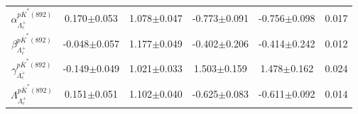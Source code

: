 \begin{table}[h]
{\begin{tabular}{cccccc}
            $\alpha_{\Lambda_c^+}^{p\overline{K}^*(892)}$ & 0.170$\pm$0.053 & 1.078$\pm$0.047 & -0.773$\pm$0.091 & -0.756$\pm$0.098 & 0.017\\
            $\beta_{\Lambda_c^+}^{p\overline{K}^*(892)}$ & -0.048$\pm$0.057 & 1.177$\pm$0.049 & -0.402$\pm$0.206 & -0.414$\pm$0.242 & 0.012\\
            $\gamma_{\Lambda_c^+}^{p\overline{K}^*(892)}$ & -0.149$\pm$0.049 & 1.021$\pm$0.033 & 1.503$\pm$0.159 & 1.478$\pm$0.162 & 0.024\\
            $\Lambda_{\Lambda_c^+}^{p\overline{K}^*(892)}$ & 0.151$\pm$0.051 & 1.102$\pm$0.040 & -0.625$\pm$0.083 & -0.611$\pm$0.092 & 0.014\\
        \hline\hline
        \end{tabular}
        }
\end{table}

